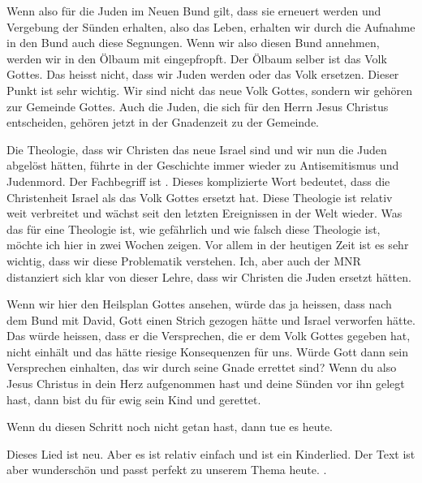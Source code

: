        \begin{otsblock}[Schlussfolgerung]
            Wenn also für die Juden im Neuen Bund gilt, dass sie erneuert werden und Vergebung der Sünden erhalten, also das Leben, erhalten wir durch die Aufnahme in den Bund auch diese Segnungen. Wenn wir also diesen Bund annehmen, werden wir in den Ölbaum mit eingepfropft. Der Ölbaum selber ist das Volk Gottes. Das heisst nicht, dass wir Juden werden oder das Volk ersetzen. Dieser Punkt ist sehr wichtig. Wir sind nicht das neue Volk Gottes, sondern wir gehören zur Gemeinde Gottes. Auch die Juden, die sich für den Herrn Jesus Christus entscheiden, gehören jetzt in der Gnadenzeit zu der Gemeinde.
    
            Die Theologie, dass wir Christen das neue Israel sind und wir nun die Juden abgelöst hätten, führte in der Geschichte immer wieder zu Antisemitismus und Judenmord. Der Fachbegriff ist . Dieses komplizierte Wort bedeutet, dass die Christenheit Israel als das Volk Gottes ersetzt hat. Diese Theologie ist relativ weit verbreitet und wächst seit den letzten Ereignissen in der Welt wieder. Was das für eine Theologie ist, wie gefährlich und wie falsch diese Theologie ist, möchte ich hier in zwei Wochen zeigen. Vor allem in der heutigen Zeit ist es sehr wichtig, dass wir diese Problematik verstehen. Ich, aber auch der MNR distanziert sich klar von dieser Lehre, dass wir Christen die Juden ersetzt hätten.
    
            Wenn wir hier den Heilsplan Gottes ansehen, würde das ja heissen, dass nach dem Bund mit David, Gott einen Strich gezogen hätte und Israel verworfen hätte. Das würde heissen, dass er die Versprechen, die er dem Volk Gottes gegeben hat, nicht einhält und das hätte riesige Konsequenzen für uns. Würde Gott dann sein Versprechen einhalten, das wir durch seine Gnade errettet sind?  Wenn du also Jesus Christus in dein Herz aufgenommen hast und deine Sünden vor ihn gelegt hast, dann bist du für ewig sein Kind und gerettet.
    
            Wenn du diesen Schritt noch nicht getan hast, dann tue es heute.             
        \end{otsblock}


    Dieses Lied ist neu. Aber es ist relativ einfach und ist ein Kinderlied. Der Text ist aber wunderschön und passt perfekt zu unserem Thema heute.
    .